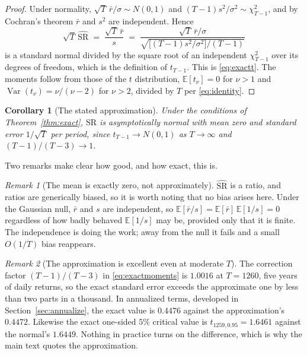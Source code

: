 \documentclass[11pt]{article}
\newtheorem{corollary}{Corollary}
\theoremstyle{remark}
\newtheorem*{remark}{Remark}
\theoremstyle{definition}
\newcommand{\SRhat}{\widehat{\text{SR}}}
\begin{document}
\begin{proof}
Under normality, $\sqrt{T}\,\bar r/\sigma \sim N(0,1)$ and $(T-1)s^2/\sigma^2 \sim \chi^2_{T-1}$, and by Cochran's theorem $\bar r$ and $s^2$ are independent. Hence
\begin{equation*}
\sqrt{T}\,\SRhat \;=\; \frac{\sqrt{T}\,\bar r}{s}
\;=\; \frac{\sqrt{T}\,\bar r/\sigma}{\sqrt{\big[(T-1)s^2/\sigma^2\big]/(T-1)}}
\end{equation*}
is a standard normal divided by the square root of an independent $\chi^2_{T-1}$ over its degrees of freedom, which is the definition of $t_{T-1}$. This is \eqref{eq:exactt}. The moments follow from those of the $t$ distribution, $\mathbb{E}[t_\nu]=0$ for $\nu>1$ and $\operatorname{Var}(t_\nu)=\nu/(\nu-2)$ for $\nu>2$, divided by $T$ per \eqref{eq:identity}.
\end{proof}

\begin{corollary}[The stated approximation]
\label{cor:stated}
Under the conditions of Theorem~\ref{thm:exact}, $\SRhat$ is asymptotically normal with mean zero and standard error $1/\sqrt{T}$ per period, since $t_{T-1} \to N(0,1)$ as $T \to \infty$ and $(T-1)/(T-3) \to 1$.
\end{corollary}

Two remarks make clear how good, and how exact, this is.

\begin{remark}[The mean is exactly zero, not approximately]
\label{rem:unbiased}
$\SRhat$ is a ratio, and ratios are generically biased, so it is worth noting that no bias arises here. Under the Gaussian null, $\bar r$ and $s$ are independent, so $\mathbb{E}[\bar r/s] = \mathbb{E}[\bar r]\,\mathbb{E}[1/s] = 0$ regardless of how badly behaved $\mathbb{E}[1/s]$ may be, provided only that it is finite. The independence is doing the work; away from the null it fails and a small $O(1/T)$ bias reappears.
\end{remark}

\begin{remark}[The approximation is excellent even at moderate $T$]
\label{rem:accuracy}
The correction factor $(T-1)/(T-3)$ in \eqref{eq:exactmoments} is $1.0016$ at $T=1260$, five years of daily returns, so the exact standard error exceeds the approximate one by less than two parts in a thousand. In annualized terms, developed in Section~\ref{sec:annualize}, the exact value is $0.4476$ against the approximation's $0.4472$. Likewise the exact one-sided $5\%$ critical value is $t_{1259,0.95} = 1.6461$ against the normal's $1.6449$. Nothing in practice turns on the difference, which is why the main text quotes the approximation.
\end{remark}
\end{document}
